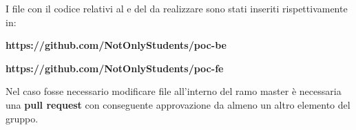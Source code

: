 \label{RepoPoc}I file con il codice relativi al  e  del  da realizzare sono stati inseriti rispettivamente in:
\begin{center}
	\textbf{https://github.com/NotOnlyStudents/poc-be}
\end{center}
\begin{center}
	\textbf{https://github.com/NotOnlyStudents/poc-fe}
\end{center}

\label{ModificaRepo}Nel caso fosse necessario modificare file all'interno del ramo master è necessaria una \textbf{pull request} con conseguente approvazione da almeno un altro elemento del gruppo.
